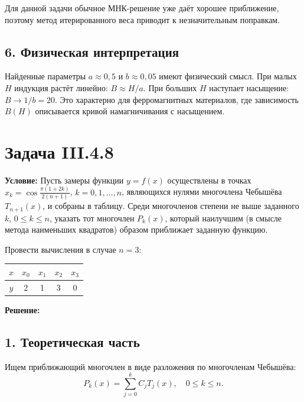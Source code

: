 \documentclass{article}
\begin{document}
Для данной задачи обычное МНК-решение уже даёт хорошее приближение, поэтому метод итерированного веса приводит к незначительным поправкам.

\subsection*{6. Физическая интерпретация}

Найденные параметры $a \approx 0{,}5$ и $b \approx 0{,}05$ имеют физический смысл. При малых $H$ индукция растёт линейно: $B \approx H/a$. При больших $H$ наступает насыщение: $B \to 1/b = 20$. Это характерно для ферромагнитных материалов, где зависимость $B(H)$ описывается кривой намагничивания с насыщением.

\newpage



\section*{Задача III.4.8}

\textbf{Условие:} Пусть замеры функции $y = f(x)$ осуществлены в точках $x_k = \cos\frac{\pi(1+2k)}{2(n+1)}$, $k = 0, 1, \ldots, n$, являющихся нулями многочлена Чебышёва $T_{n+1}(x)$, и собраны в таблицу. Среди многочленов степени не выше заданного $k$, $0 \le k \le n$, указать тот многочлен $P_k(x)$, который наилучшим (в смысле метода наименьших квадратов) образом приближает заданную функцию.

Провести вычисления в случае $n = 3$:

\begin{center}
\begin{tabular}{|c|c|c|c|c|}
\hline
$x$ & $x_0$ & $x_1$ & $x_2$ & $x_3$ \\
\hline
$y$ & 2 & 1 & 3 & 0 \\
\hline
\end{tabular}
\end{center}

\vspace{0.5cm}
\textbf{Решение:}

\subsection*{1. Теоретическая часть}

Ищем приближающий многочлен в виде разложения по многочленам Чебышёва:
\begin{equation}
P_k(x) = \sum_{j=0}^{k} C_j T_j(x), \quad 0 \le k \le n.
\label{eq:48_pk}
\end{equation}
\end{document}
